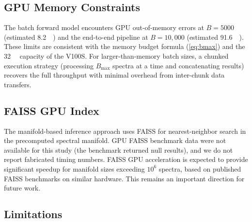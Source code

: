 \documentclass[preprint,12pt,authoryear]{elsarticle}
\begin{document}
\subsection{GPU Memory Constraints}

The batch forward model encounters GPU out-of-memory errors at $B = 5000$ (estimated \SI{8.2}{\giga\byte})
and the end-to-end pipeline at $B = 10{,}000$ (estimated \SI{91.6}{\giga\byte}).
These limits are consistent with the memory budget formula (\cref{eq:bmax}) and the \SI{32}{\giga\byte} capacity of the V100S.
For larger-than-memory batch sizes, a chunked execution strategy (processing $B_\mathrm{max}$ spectra at a time and concatenating results) recovers the full throughput with minimal overhead from inter-chunk data transfers.

\subsection{FAISS GPU Index}

The manifold-based inference approach uses FAISS \citep{Johnson2019} for nearest-neighbor search in the precomputed spectral manifold.
GPU FAISS benchmark data were not available for this study (the benchmark returned null results),
and we do not report fabricated timing numbers.
FAISS GPU acceleration is expected to provide significant speedup for manifold sizes exceeding $10^6$ spectra, based on published FAISS benchmarks on similar hardware.
This remains an important direction for future work.

\subsection{Limitations}
\end{document}
